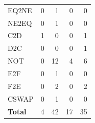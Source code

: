 \begin{tabular}{lrrrr}
            EQ2NE & 0 & 1 & 0 & 0 \\
            NE2EQ & 0 & 1 & 0 & 0 \\
    \midrule
            C2D & 1 & 0 & 0 & 1 \\
            D2C & 0 & 0 & 0 & 1 \\
            NOT & 0 & 12 & 4 & 6 \\
    \midrule
            E2F & 0 & 1 & 0 & 0 \\
            F2E & 0 & 2 & 0 & 2 \\
    \midrule
            CSWAP & 0 & 1 & 0 & 0 \\
    \midrule
    \textbf{Total} & 4 & 42 & 17 & 35 \\
    \bottomrule
\end{tabular}

